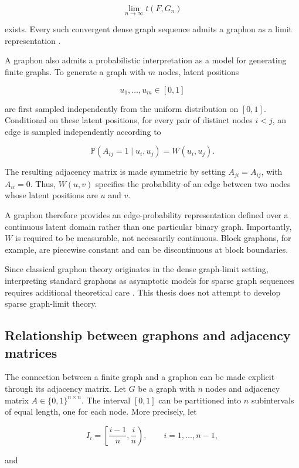 \[
\lim_{n\to\infty}t(F,G_n)
\]

exists. Every such convergent dense graph sequence admits a graphon as a limit representation \cite{lovasz2006limits}.

A graphon also admits a probabilistic interpretation as a model for generating finite graphs. To generate a graph with \(m\) nodes, latent positions

\[
u_1,\ldots,u_m\in[0,1]
\]

are first sampled independently from the uniform distribution on \([0,1]\). Conditional on these latent positions, for every pair of distinct nodes \(i<j\), an edge is sampled independently according to

\[
\mathbb{P}\!\left(A_{ij}=1\mid u_i,u_j\right)
=
W(u_i,u_j).
\]

The resulting adjacency matrix is made symmetric by setting \(A_{ji}=A_{ij}\), with \(A_{ii}=0\). Thus, \(W(u,v)\) specifies the probability of an edge between two nodes whose latent positions are \(u\) and \(v\).

A graphon therefore provides an edge-probability representation defined over a continuous latent domain rather than one particular binary graph. Importantly, \(W\) is required to be measurable, not necessarily continuous. Block graphons, for example, are piecewise constant and can be discontinuous at block boundaries.

Since classical graphon theory originates in the dense graph-limit setting, interpreting standard graphons as asymptotic models for sparse graph sequences requires additional theoretical care \cite{lovasz2006limits,borgs2019lp}. This thesis does not attempt to develop sparse graph-limit theory.


\subsection{Relationship between graphons and adjacency matrices}
\label{subsec:graphon_adjacency}

The connection between a finite graph and a graphon can be made explicit through its adjacency matrix. Let \(G\) be a graph with \(n\) nodes and adjacency matrix \(A\in\{0,1\}^{n\times n}\). The interval \([0,1]\) can be partitioned into \(n\) subintervals of equal length, one for each node. More precisely, let

\[
I_i=\left[\frac{i-1}{n},\frac{i}{n}\right),
\qquad i=1,\ldots,n-1,
\]

and

